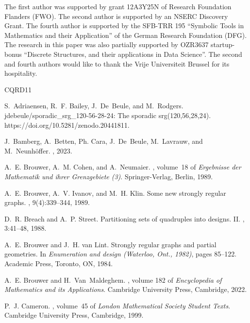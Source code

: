 \documentclass[a4paper]{article}
\theoremstyle{definition}
\begin{document}
The first author was supported by grant 12A3Y25N of Research Foundation Flanders (FWO).  The second author is supported by an NSERC Discovery Grant.  The fourth author is supported by
the SFB-TRR 195 ``Symbolic Tools in Mathematics and their Application'' of the German Research Foundation (DFG).  The research in this paper was also partially supported by OZR3637 startup-bonus ``Discrete Structures, and their applications in Data Science''.
The second and fourth authors would like to thank the Vrije Universiteit Brussel for its hospitality. 

\newcommand{\etalchar}[1]{$^{#1}$}
\begin{thebibliography}{CQRD11}

S.~Adriaensen, R.~F. Bailey, J.~De~Beule, and M.~Rodgers.
\newblock jdebeule/sporadic\_srg\_120-56-28-24: The sporadic srg(120,56,28,24).
\newblock https://doi.org/10.5281/zenodo.20441811.

\bibitem[BBC{\etalchar{+}}23]{fining}
J.~Bamberg, A.~Betten, Ph. Cara, J.~De~Beule, M.~Lavrauw, and M.~Neunh\"offer.
, 2023.

A.~E. Brouwer, A.~M. Cohen, and A.~Neumaier.
, volume~18 of {\em Ergebnisse der Mathematik und ihrer Grenzgebiete (3)}.
\newblock Springer-Verlag, Berlin, 1989.

A.~E. Brouwer, A.~V. Ivanov, and M.~H. Klin.
\newblock Some new strongly regular graphs.
, 9(4):339--344, 1989.

D.~R. Breach and A.~P. Street.
\newblock Partitioning sets of quadruples into designs. {II}.
, 3:41--48, 1988.

A.~E. Brouwer and J.~H. van Lint.
\newblock Strongly regular graphs and partial geometries.
\newblock In {\em Enumeration and design ({W}aterloo, {O}nt., 1982)}, pages 85--122. Academic Press, Toronto, ON, 1984.

A.~E. Brouwer and H.~Van~Maldeghem.
, volume 182 of {\em Encyclopedia of Mathematics and its Applications}.
\newblock Cambridge University Press, Cambridge, 2022.

P.~J. Cameron.
, volume~45 of {\em London Mathematical Society Student Texts}.
\newblock Cambridge University Press, Cambridge, 1999.


\end{thebibliography}
\end{document}

